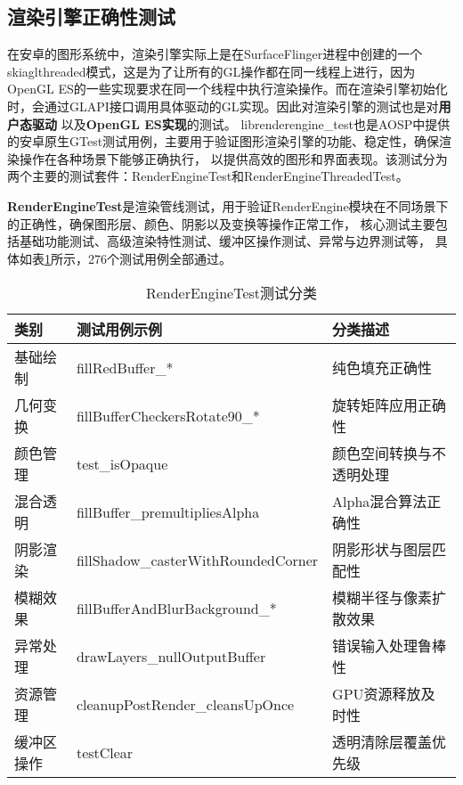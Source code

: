 
\subsection{渲染引擎正确性测试}
\label{sec:渲染引擎正确性测试}

在安卓的图形系统中，渲染引擎实际上是在SurfaceFlinger进程中创建的一个skiaglthreaded模式，这是为了让所有的GL操作都在同一线程上进行，因为
OpenGL ES的一些实现要求在同一个线程中执行渲染操作。而在渲染引擎初始化时，会通过GLAPI接口调用具体驱动的GL实现。因此对渲染引擎的测试也是对\textbf{用户态驱动}
以及\textbf{OpenGL ES实现}的测试。
librenderengine\_test也是AOSP中提供的安卓原生GTest测试用例，主要用于验证图形渲染引擎的功能、稳定性，确保渲染操作在各种场景下能够正确执行，
以提供高效的图形和界面表现。该测试分为两个主要的测试套件：RenderEngineTest和RenderEngineThreadedTest。

\textbf{RenderEngineTest}是渲染管线测试，用于验证RenderEngine模块在不同场景下的正确性，确保图形层、颜色、阴影以及变换等操作正常工作，
核心测试主要包括基础功能测试、高级渲染特性测试、缓冲区操作测试、异常与边界测试等，
具体如表\ref{tab:RenderEngineTest测试分类}所示，276个测试用例全部通过。
    \begin{table}[H]
        \centering
        \caption{RenderEngineTest测试分类}
        \label{tab:RenderEngineTest测试分类}
        \begin{tabular}{lll}
          \toprule
          类别 & 测试用例示例 & 分类描述 \\
          \midrule
            基础绘制 & fillRedBuffer\_* & 纯色填充正确性 \\
            几何变换 & fillBufferCheckersRotate90\_* & 旋转矩阵应用正确性 \\
            颜色管理 & test\_isOpaque & 颜色空间转换与不透明处理 \\
            混合透明 & fillBuffer\_premultipliesAlpha & Alpha混合算法正确性 \\
            阴影渲染 & fillShadow\_casterWithRoundedCorner & 阴影形状与图层匹配性 \\
            模糊效果 & fillBufferAndBlurBackground\_* & 模糊半径与像素扩散效果 \\
            异常处理 & drawLayers\_nullOutputBuffer & 错误输入处理鲁棒性 \\
            资源管理 & cleanupPostRender\_cleansUpOnce & GPU资源释放及时性 \\
            缓冲区操作 & testClear & 透明清除层覆盖优先级 \\
          \bottomrule
        \end{tabular}
        \note{}
    \end{table}

